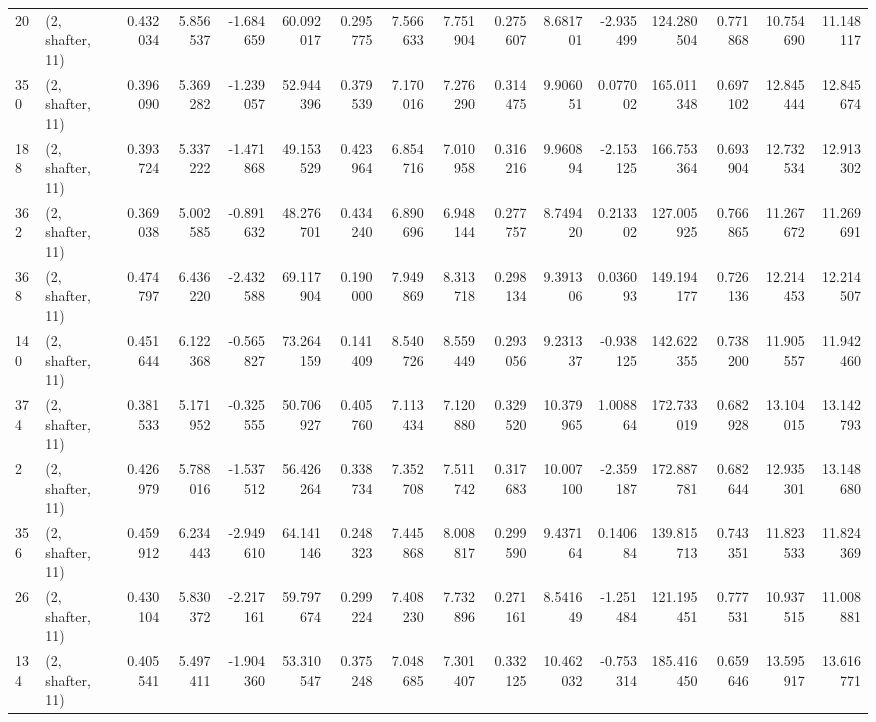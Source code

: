 \begin{tabular}{llrrrrrrrrrrrrrr}
20  &  (2, shafter, 11) &   0.432034 &   5.856537 &  -1.684659 &    60.092017 &   0.295775 &   7.566633 &   7.751904 &  0.275607 &   8.681701 &  -2.935499 &    124.280504 &    0.771868 &   10.754690 &   11.148117 \\
350 &  (2, shafter, 11) &   0.396090 &   5.369282 &  -1.239057 &    52.944396 &   0.379539 &   7.170016 &   7.276290 &  0.314475 &   9.906051 &   0.077002 &    165.011348 &    0.697102 &   12.845444 &   12.845674 \\
188 &  (2, shafter, 11) &   0.393724 &   5.337222 &  -1.471868 &    49.153529 &   0.423964 &   6.854716 &   7.010958 &  0.316216 &   9.960894 &  -2.153125 &    166.753364 &    0.693904 &   12.732534 &   12.913302 \\
362 &  (2, shafter, 11) &   0.369038 &   5.002585 &  -0.891632 &    48.276701 &   0.434240 &   6.890696 &   6.948144 &  0.277757 &   8.749420 &   0.213302 &    127.005925 &    0.766865 &   11.267672 &   11.269691 \\
368 &  (2, shafter, 11) &   0.474797 &   6.436220 &  -2.432588 &    69.117904 &   0.190000 &   7.949869 &   8.313718 &  0.298134 &   9.391306 &   0.036093 &    149.194177 &    0.726136 &   12.214453 &   12.214507 \\
140 &  (2, shafter, 11) &   0.451644 &   6.122368 &  -0.565827 &    73.264159 &   0.141409 &   8.540726 &   8.559449 &  0.293056 &   9.231337 &  -0.938125 &    142.622355 &    0.738200 &   11.905557 &   11.942460 \\
374 &  (2, shafter, 11) &   0.381533 &   5.171952 &  -0.325555 &    50.706927 &   0.405760 &   7.113434 &   7.120880 &  0.329520 &  10.379965 &   1.008864 &    172.733019 &    0.682928 &   13.104015 &   13.142793 \\
2   &  (2, shafter, 11) &   0.426979 &   5.788016 &  -1.537512 &    56.426264 &   0.338734 &   7.352708 &   7.511742 &  0.317683 &  10.007100 &  -2.359187 &    172.887781 &    0.682644 &   12.935301 &   13.148680 \\
356 &  (2, shafter, 11) &   0.459912 &   6.234443 &  -2.949610 &    64.141146 &   0.248323 &   7.445868 &   8.008817 &  0.299590 &   9.437164 &   0.140684 &    139.815713 &    0.743351 &   11.823533 &   11.824369 \\
26  &  (2, shafter, 11) &   0.430104 &   5.830372 &  -2.217161 &    59.797674 &   0.299224 &   7.408230 &   7.732896 &  0.271161 &   8.541649 &  -1.251484 &    121.195451 &    0.777531 &   10.937515 &   11.008881 \\
134 &  (2, shafter, 11) &   0.405541 &   5.497411 &  -1.904360 &    53.310547 &   0.375248 &   7.048685 &   7.301407 &  0.332125 &  10.462032 &  -0.753314 &    185.416450 &    0.659646 &   13.595917 &   13.616771 \\

\end{tabular}
